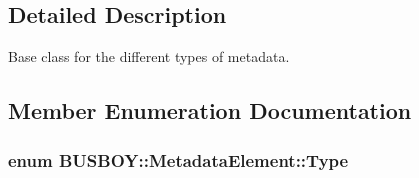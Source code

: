 \subsection{Detailed Description}
Base class for the different types of metadata. 

\subsection{Member Enumeration Documentation}
\hypertarget{classBUSBOY_1_1MetadataElement_ab66bf575c7d26f857a2871d42bd97d12}{
\subsubsection[{Type}]{\setlength{\rightskip}{0pt plus 5cm}enum {\bf BUSBOY::MetadataElement::Type}}}
\label{classBUSBOY_1_1MetadataElement_ab66bf575c7d26f857a2871d42bd97d12}
